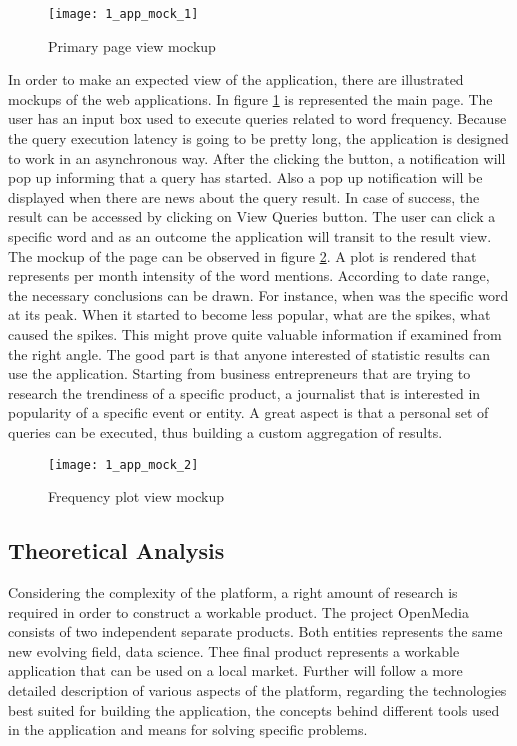 \begin{figure}[!ht]
\centering
\texttt{[image: 1\_app\_mock\_1]}
\caption{Primary page view mockup}\label{app_mock_1}
\end{figure}

In order to make an expected view of the application, there are illustrated mockups of the web applications. In figure \mbox{\ref{app_mock_1}} is represented the main page. The user has an input box used to execute queries related to word frequency. Because the query execution latency is going to be pretty long, the application is designed to work in an asynchronous way. After the clicking the button, a notification will pop up informing that a query has started. Also a pop up notification will be displayed when there are news about the query result. In case of success, the result can be accessed by clicking on View Queries button. The user can click a specific word and as an outcome the application will transit to the result view. The mockup of the page can be observed in figure \mbox{\ref{app_mock_2}}. A plot is rendered that represents per month intensity of the word mentions. According to date range, the necessary conclusions can be drawn. For instance, when was the specific word at its peak. When it started to become less popular, what are the spikes, what caused the spikes. This might prove quite valuable information if examined from the right angle. The good part is that anyone interested of statistic results can use the application. Starting from business entrepreneurs that are trying to research the trendiness of a specific product, a journalist that is interested in popularity of a specific event or entity. A great aspect is that a personal set of queries can be executed, thus building a custom aggregation of results.

\begin{figure}[!ht]
\centering
\texttt{[image: 1\_app\_mock\_2]}
\caption{Frequency plot view mockup}\label{app_mock_2}
\end{figure}

\subsection{Theoretical Analysis}
Considering the complexity of the platform, a right amount of research is required in order to construct a workable product. The project OpenMedia consists of two independent separate products. Both entities represents the same new evolving field, data science. Thee final product represents a workable application that can be used on a local market. Further will follow a more detailed description of various aspects of the platform, regarding the technologies best suited for building the application, the concepts behind different tools used in the application and means for solving specific problems.

